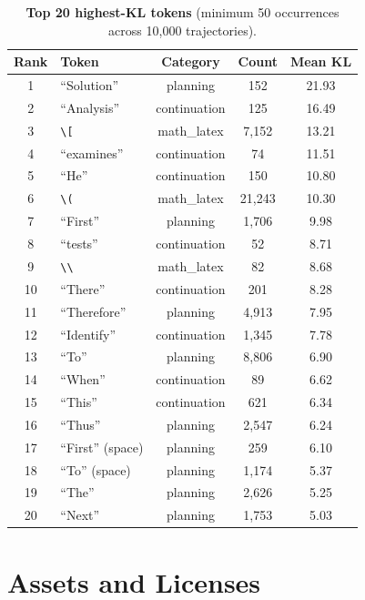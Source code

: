 \documentclass{article}
\begin{document}
\begin{table}[!htbp]
\centering
\caption{\textbf{Top 20 highest-KL tokens} (minimum 50 occurrences across 10,000 trajectories).}
\label{tab:app_high_kl_tokens}
\small
\begin{tabular}{clccc}
\toprule
\textbf{Rank} & \textbf{Token} & \textbf{Category} & \textbf{Count} & \textbf{Mean KL} \\
\midrule
1 & ``Solution'' & planning & 152 & 21.93 \\
2 & ``Analysis'' & continuation & 125 & 16.49 \\
3 & \texttt{\textbackslash[} & math\_latex & 7,152 & 13.21 \\
4 & ``examines'' & continuation & 74 & 11.51 \\
5 & ``He'' & continuation & 150 & 10.80 \\
6 & \texttt{\textbackslash(} & math\_latex & 21,243 & 10.30 \\
7 & ``First'' & planning & 1,706 & 9.98 \\
8 & ``tests'' & continuation & 52 & 8.71 \\
9 & \texttt{\textbackslash\textbackslash} & math\_latex & 82 & 8.68 \\
10 & ``There'' & continuation & 201 & 8.28 \\
11 & ``Therefore'' & planning & 4,913 & 7.95 \\
12 & ``Identify'' & continuation & 1,345 & 7.78 \\
13 & ``To'' & planning & 8,806 & 6.90 \\
14 & ``When'' & continuation & 89 & 6.62 \\
15 & ``This'' & continuation & 621 & 6.34 \\
16 & ``Thus'' & planning & 2,547 & 6.24 \\
17 & ``First'' (space) & planning & 259 & 6.10 \\
18 & ``To'' (space) & planning & 1,174 & 5.37 \\
19 & ``The'' & planning & 2,626 & 5.25 \\
20 & ``Next'' & planning & 1,753 & 5.03 \\
\bottomrule
\end{tabular}
\end{table}


\section{Assets and Licenses}
\label{app:licenses}
\end{document}
